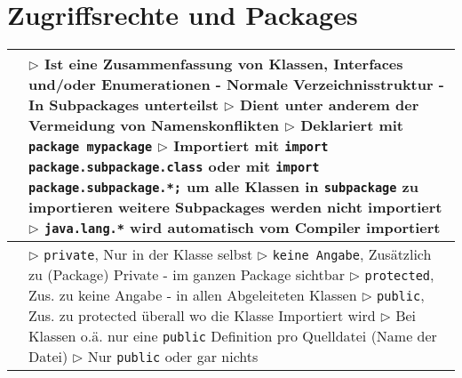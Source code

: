 \section{Zugriffsrechte und Packages}


	\begin{table}[H]
	\label{Zugriffsrechte und Packages}
	\begin{tabular}{ | p{4cm} p{13.5cm} | }


	\hline
	\makecell[l]{Packages} & 
	\makecell[l]
	{
	$\rhd$ Ist eine Zusammenfassung von Klassen, Interfaces und/oder 
	Enumerationen \\
	\hspace{0.5cm} - Normale Verzeichnisstruktur \\
	\hspace{0.5cm} - In Subpackages unterteilst \\
	$\rhd$ Dient unter anderem der Vermeidung von Namenskonflikten \\
	$\rhd$ Deklariert mit \texttt{package mypackage} \\
	$\rhd$ Importiert mit \texttt{import package.subpackage.class} \\
	\hspace{0.5cm} oder mit \texttt{import package.subpackage.*;} \\
	\hspace{0.5cm} um alle Klassen in \texttt{subpackage} zu importieren\\
	\hspace{0.5cm} weitere Subpackages werden nicht importiert \\
	$\rhd$ \texttt{java.lang.*} wird automatisch vom Compiler importiert
	} 	\\ \hline

	\makecell[l]{Zugriffsrechte} & 
	\makecell[l]
	{
	$\rhd$ \texttt{private}, Nur in der Klasse selbst \\
	$\rhd$ \texttt{keine Angabe}, Zusätzlich zu (Package) Private - im 
	ganzen Package 
	sichtbar \\
	$\rhd$ \texttt{protected}, Zus. zu keine Angabe - in allen 
	Abgeleiteten Klassen \\
	$\rhd$ \texttt{public}, Zus. zu protected überall wo die Klasse 
	Importiert wird \\ \\
	$\rhd$ Bei Klassen o.ä. nur eine \texttt{public} Definition pro 
	Quelldatei (Name der Datei) \\
	$\rhd$ Nur \texttt{public} oder gar nichts
	} 	\\ \hline
	
	\end{tabular}
	\end{table}



